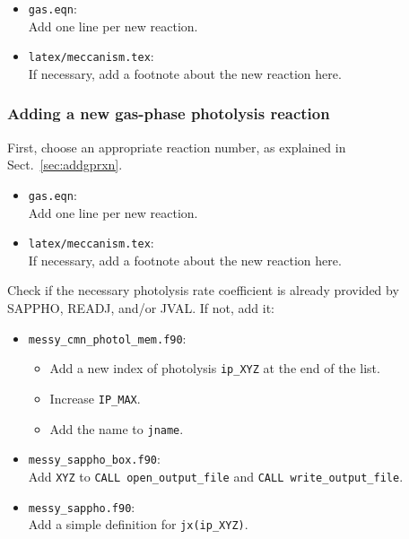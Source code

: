 \documentclass[twoside]{article}
\def\nosep{\setlength\parsep{0mm}\setlength\topsep{0mm}\setlength\itemsep{0mm}}
\begin{document}
\begin{itemize}\nosep
\item \verb|gas.eqn|:\\
  Add one line per new reaction.
\end{itemize}

\begin{itemize}\nosep
\item \verb|latex/meccanism.tex|:\\
  If necessary, add a footnote about the new reaction here.
\end{itemize}

\subsubsection{Adding a new gas-phase photolysis reaction}

First, choose an appropriate reaction number, as explained in
Sect.~\ref{sec:addgprxn}.

\begin{itemize}\nosep
\item \verb|gas.eqn|:\\
  Add one line per new reaction.
\end{itemize}

\begin{itemize}\nosep
\item \verb|latex/meccanism.tex|:\\
  If necessary, add a footnote about the new reaction here.
\end{itemize}

Check if the necessary photolysis rate coefficient is already provided
by SAPPHO, READJ, and/or JVAL. If not, add it:

\begin{itemize}\nosep
\item \verb|messy_cmn_photol_mem.f90|:\\
  \begin{itemize}\nosep
  \item Add a new index of photolysis \verb|ip_XYZ| at the end of the
    list.
  \item Increase \verb|IP_MAX|.
  \item Add the name to \verb|jname|.
  \end{itemize}
\end{itemize}

\begin{itemize}\nosep
\item \verb|messy_sappho_box.f90|:\\
  Add \verb|XYZ| to \verb|CALL open_output_file| and
  \verb|CALL write_output_file|.
\item \verb|messy_sappho.f90|:\\
  Add a simple definition for \verb|jx(ip_XYZ)|.
\end{itemize}
\end{document}
